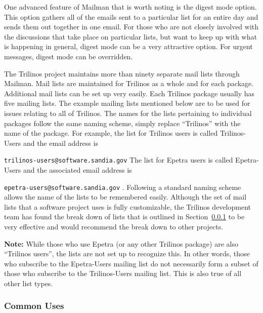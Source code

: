 \documentclass[12pt,relax]{article}
\newcommand{\InlineCommand}[1]{
  {\hspace{0.01 in}} {\tt #1} {\hspace{0.01 in}}}
\begin{document}
One advanced feature of Mailman that is worth noting is the digest mode option.
This option gathers all of the emails sent to a particular list for an entire 
day and sends them out together in one email.  For those who are not closely 
involved with the discussions that take place on particular lists, but want to 
keep up with what is happening in general, digest mode can be a very 
attractive option.  For urgent messages, digest mode can 
be overridden.

The Trilinos project maintains more than ninety separate mail lists through 
Mailman.  Mail lists are maintained for Trilinos as a whole and for each 
package.  Additional mail lists can be set up very easily.  Each Trilinos 
package usually has five mailing lists.  The example mailing lists mentioned 
below are to be used for issues relating to all of Trilinos.  
The names for the lists pertaining to individual packages follow the same 
naming scheme, simply replace ``Trilinos'' with the name of the package.  For example, the list for Trilinos users is 
called Trilinos-Users and the email address is 
\InlineCommand{trilinos-users@software.sandia.gov}  The list 
for Epetra users is called Epetra-Users and the associated email address is 
\InlineCommand{epetra-users@software.sandia.gov}.  Following a standard naming
scheme allows the name of the lists to be remembered easily.  Although the 
set of mail lists that a software project uses is fully customizable, the 
Trilinos development team has found the break down of lists that is outlined 
in Section~\ref{subsubsect:MailmanUses} to be very effective 
and would recommend the break down to other projects.

{\bf Note:}
While those who use Epetra (or any other Trilinos package) are also
``Trilinos users'', the lists are not set up to recognize this.  In other 
words, those who subscribe to the Epetra-Users mailing list do not necessarily 
form a subset of those who subscribe to the Trilinos-Users mailing list.  This 
is also true of all other list types.  

\subsubsection{Common Uses}
\label{subsubsect:MailmanUses}
\end{document}

